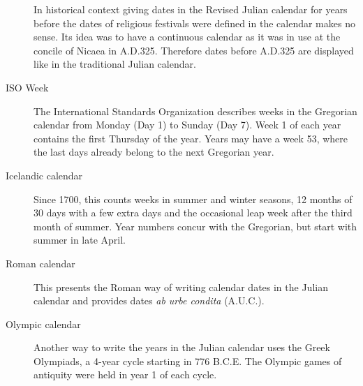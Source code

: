 \begin{description}
  In historical context giving dates in the Revised Julian calendar
  for years before the dates of religious festivals were defined in
  the calendar makes no sense. Its idea was to have a continuous
  calendar as it was in use at the concile of Nicaea in
  A.D.325. Therefore dates before A.D.325 are displayed like in the
  traditional Julian calendar.
\item[ISO Week] The International Standards Organization describes
  weeks in the Gregorian calendar from Monday (Day 1) to Sunday (Day
  7). Week 1 of each year contains the first Thursday of the
  year. Years may have a week 53, where the last days already belong
  to the next Gregorian year.
\item[Icelandic calendar] Since 1700, this counts weeks in summer and
  winter seasons, 12 months of 30 days with a few extra days and the
  occasional leap week after the third month of summer. Year numbers
  concur with the Gregorian, but start with summer in late April.
\item[Roman calendar] This presents the Roman way of writing calendar
  dates in the Julian calendar and provides dates \emph{ab urbe condita} (A.U.C.).
\item[Olympic calendar] Another way to write the years in the Julian
  calendar uses the Greek Olympiads, a 4-year cycle starting in 776
  B.C.E. The Olympic games of antiquity were held in year 1 of each cycle.
\end{description}

